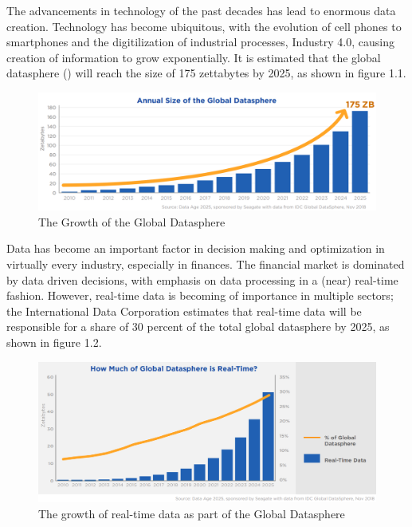 The advancements in technology of the past decades has lead to enormous data creation. Technology has become ubiquitous, 
with the evolution of cell phones to smartphones 
and the digitilization of industrial processes, Industry 4.0, causing creation of information to grow exponentially.
It is estimated that the global datasphere () will reach the size of 175 zettabytes by 2025, as shown in figure 1.1.
\begin{figure}[ht]
\centering
\includegraphics[width=1.0\textwidth]{Bilder/size_global_datasphere.png}
\caption{The Growth of the Global Datasphere \cite[p.6]{idc-seagate-data}}
\label{fig:growth_datasphere}
\end{figure}

Data has become an important factor in decision making and optimization in virtually every industry, especially in finances. 
The financial market is dominated by data driven decisions, with emphasis on data processing in a (near) real-time fashion.
However, real-time data is becoming of importance in multiple sectors; the International Data Corporation estimates that real-time data will be 
responsible for a share of 30 percent of the total global datasphere by 2025, as shown in figure 1.2.
\begin{figure}[h]
\centering
\includegraphics[width=1.0\textwidth]{Bilder/realtime_data.png}
\caption{The growth of real-time data as part of the Global Datasphere \cite[p.13]{idc-seagate-data}}
\label{fig:growth_realtime_data}
\end{figure}

